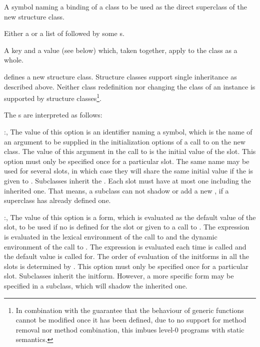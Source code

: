 \begin{optDefinition}
\begin{arguments}
    \item[\scref{superclass-name}] A symbol naming a binding of a class to be
    used as the direct superclass of the new structure class.

    \item[\scref{slot}] Either a  or a list of
     followed by some s.

    \item[\scref{class-option}] A key and a value (see below) which, taken
    together, apply to the class as a whole.
\end{arguments}
%
\remarks%
 defines a new structure class. Structure classes support
single inheritance as described above. Neither class redefinition nor changing
the class of an instance is supported by structure classes\footnote{In
    combination with the guarantee that the behaviour of generic functions
    cannot be modified once it has been defined, due to no support for method
    removal nor method combination, this imbues level-0 programs with static
    semantics.}.

The s are interpreted as follows:
\begin{options}
    \item[\keyworddef{keyword}:, \scref{identifier}]%
    The value of this option is an identifier naming a symbol, which is the name
    of an argument to be supplied in the initialization options of a call to
     on the new class.  The value of this argument in the call
    to  is the initial value of the slot.  This option must
    only be specified once for a particular slot.  The same  name
    may be used for several slots, in which case they will share the same
    initial value if the  is given to .
    Subclasses inherit the . Each slot must have at most one
     including the inherited one. That means, a subclass can not
    shadow or add a new , if a superclass has already defined
    one.

    \item[\keyworddef{default}:, \scref{level-0-form}]%
    The value of this option is a form, which is evaluated as the default
    value of the slot, to be used if no  is defined for the slot
    or given to a call to .  The expression is evaluated in
    the lexical environment of the call to  and the dynamic
    environment of the call to .  The expression is evaluated
    each time  is called and the default value is called for.
    The order of evaluation of the initforms in all the slots is determined by
    .  This option must only be specified once for a
    particular slot. Subclasses inherit the initform.  However, a more specific
    form may be specified in a subclass, which will shadow the inherited one.


\end{options}
\end{optDefinition}
